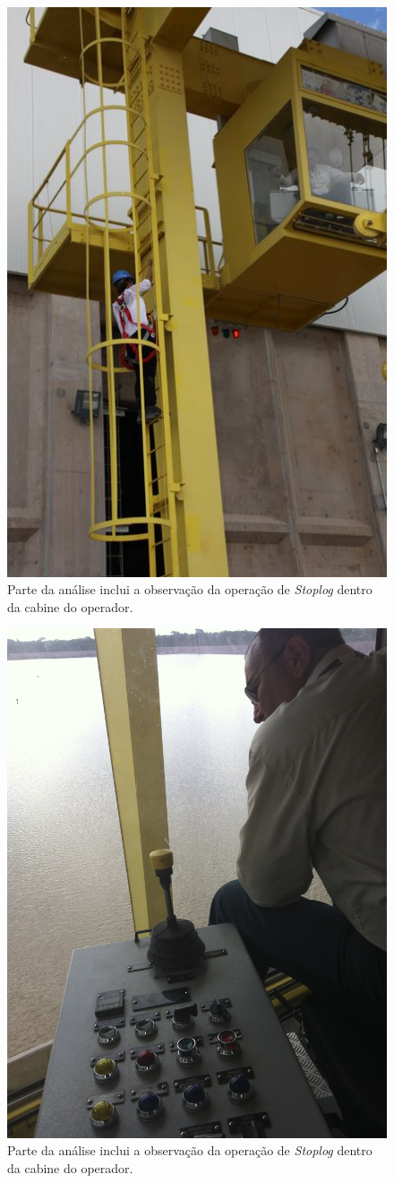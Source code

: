 \begin{figure}[h!]
    \centering \includegraphics[scale=0.4]{figs/jirau/jirau_17}
    \caption{Parte da análise inclui a observação da operação de \emph{Stoplog} dentro da cabine do operador.}
    \label{fig:jirau17}
\end{figure}

\begin{figure}[h!]
    \centering \includegraphics[width=0.5\columnwidth]{figs/jirau/jirau_18}
    \caption{Parte da análise inclui a observação da operação de \emph{Stoplog} dentro da cabine do operador.}
    \label{fig:jirau18}
\end{figure}

